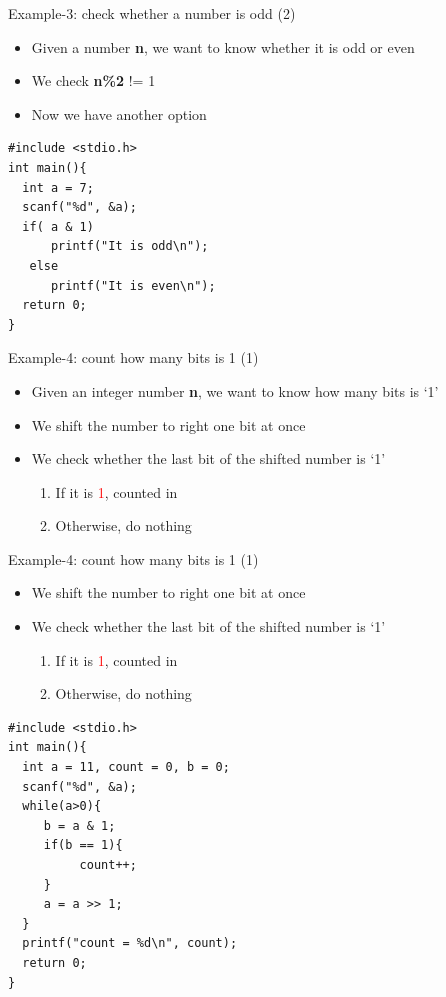 \begin{frame}[fragile]{Example-3: check whether  a number is odd (2)}
\begin{itemize}
	\item {Given a number \textbf{n}, we want to know whether it is odd or even}
	\item{We check \textbf{n\%2} != 1}
	\item {Now we have another option}
\end{itemize}
\begin{lstlisting}[linewidth=0.7\linewidth]
#include <stdio.h>
int main(){
  int a = 7;
  scanf("%d", &a);
  if( a & 1)
      printf("It is odd\n");
   else
      printf("It is even\n");
  return 0;
}
\end{lstlisting}
\end{frame}

\begin{frame}{Example-4: count how many bits is 1 (1)}
\begin{itemize}
	\item {Given an integer number \textbf{n}, we want to know how many bits is `1'}
	\item {We shift the number to right one bit at once}
	\item {We check whether the last bit of the shifted number is `1'}
	\begin{enumerate}
		\item {If it is \textcolor{red}{1},  counted in}
		\item {Otherwise, do nothing}
	\end{enumerate}
\end{itemize}

\end{frame}

\begin{frame}[fragile]{Example-4: count how many bits is 1 (1)}
\begin{itemize}
	\item {We shift the number to right one bit at once}
	\item {We check whether the last bit of the shifted number is `1'}
	\begin{enumerate}
		\item {If it is \textcolor{red}{1},  counted in}
		\item {Otherwise, do nothing}
	\end{enumerate}
\end{itemize}
\begin{lstlisting}[linewidth=0.7\linewidth]
#include <stdio.h>
int main(){
  int a = 11, count = 0, b = 0;
  scanf("%d", &a);
  while(a>0){
     b = a & 1;
     if(b == 1){
          count++;
     }
     a = a >> 1;
  }
  printf("count = %d\n", count);
  return 0;
}
\end{lstlisting}
\end{frame}


